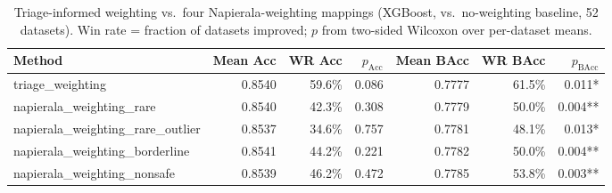 \begin{table}[t]
\centering
\caption{Triage-informed weighting vs.\ four Napierala-weighting mappings (XGBoost, vs.\ no-weighting baseline, 52 datasets). Win rate = fraction of datasets improved; $p$ from two-sided Wilcoxon over per-dataset means.}
\label{tab:weighting}
\begin{tabular}{lrrrrrr}
\toprule
Method & Mean Acc & WR Acc & $p_{\text{Acc}}$ & Mean BAcc & WR BAcc & $p_{\text{BAcc}}$ \\
\midrule
triage\_weighting & 0.8540 & 59.6\% & 0.086 & 0.7777 & 61.5\% & 0.011* \\
napierala\_weighting\_rare & 0.8540 & 42.3\% & 0.308 & 0.7779 & 50.0\% & 0.004** \\
napierala\_weighting\_rare\_outlier & 0.8537 & 34.6\% & 0.757 & 0.7781 & 48.1\% & 0.013* \\
napierala\_weighting\_borderline & 0.8541 & 44.2\% & 0.221 & 0.7782 & 50.0\% & 0.004** \\
napierala\_weighting\_nonsafe & 0.8539 & 46.2\% & 0.472 & 0.7785 & 53.8\% & 0.003** \\
\bottomrule
\end{tabular}
\end{table}

